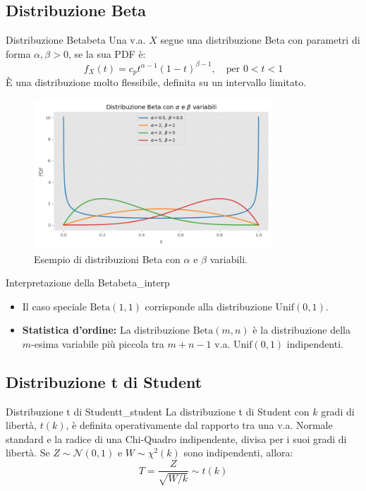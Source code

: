 \subsection{Distribuzione Beta}

\begin{definizione}{Distribuzione Beta}{beta}
Una v.a. \(X\) segue una distribuzione Beta con parametri di forma \(\alpha, \beta > 0\), se la sua PDF è:
\[
f_X(t) = c_p t^{\alpha-1}(1-t)^{\beta-1}, \quad \text{per } 0 < t < 1 \text{}
\]
È una distribuzione molto flessibile, definita su un intervallo limitato.
\end{definizione}

\begin{figure}[H]
    \centering
    \includegraphics[width=0.8\textwidth]{images/beta.png}
    \caption{Esempio di distribuzioni Beta con \(\alpha\) e \(\beta\) variabili.}
    \label{fig:beta}
\end{figure}

\begin{nota}{Interpretazione della Beta}{beta_interp}
\begin{itemize}
    \item Il caso speciale \(\text{Beta}(1,1)\) corrisponde alla distribuzione \(\text{Unif}(0,1)\).
    \item \textbf{Statistica d'ordine:} La distribuzione \(\text{Beta}(m,n)\) è la distribuzione della \(m\)-esima variabile più piccola tra \(m+n-1\) v.a. \(\text{Unif}(0,1)\) indipendenti.
\end{itemize}
\end{nota}

\subsection{Distribuzione t di Student}

\begin{definizione}{Distribuzione t di Student}{t_student}
La distribuzione t di Student con \(k\) gradi di libertà, \(t(k)\), è definita operativamente dal rapporto tra una v.a. Normale standard e la radice di una Chi-Quadro indipendente, divisa per i suoi gradi di libertà.
Se \(Z \sim \mathcal{N}(0,1)\) e \(W \sim \chi^2(k)\) sono indipendenti, allora:
\[
T = \frac{Z}{\sqrt{W/k}} \sim t(k) \text{}
\]
\end{definizione}

